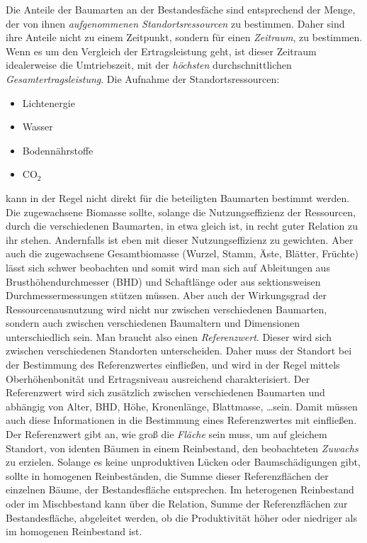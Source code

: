 \documentclass[twocolumn]{scrartcl}
\begin{document}
Die Anteile der Baumarten an der Bestandesfäche sind entsprechend der Menge, der
von ihnen \emph{aufgenommenen Standortsressourcen} zu bestimmen. Daher sind ihre
Anteile nicht zu einem Zeitpunkt, sondern für einen \emph{Zeitraum}, zu
bestimmen. Wenn es um den Vergleich der Ertragsleistung geht, ist dieser
Zeitraum idealerweise die Umtriebszeit, mit der \emph{höchsten}
durchschnittlichen \emph{Gesamtertragsleistung}. Die Aufnahme der
Standortsressourcen:
\begin{itemize}
\item Lichtenergie
\item Wasser
\item Bodennährstoffe
\item CO$_2$
\end{itemize}
kann in der Regel nicht direkt für die beteiligten Baumarten bestimmt werden.
Die zugewachsene Biomasse sollte, solange die Nutzungseffizienz der Ressourcen,
durch die verschiedenen Baumarten, in etwa gleich ist, in recht guter Relation
zu ihr stehen. Andernfalls ist eben mit dieser Nutzungseffizienz zu gewichten.
Aber auch die zugewachsene Gesamtbiomasse (Wurzel, Stamm, Äste, Blätter,
Früchte) lässt sich schwer beobachten und somit wird man sich auf Ableitungen
aus Brusthöhendurchmesser (BHD) und Schaftlänge oder aus sektionsweisen
Durchmessermessungen stützen müssen. Aber auch der Wirkungsgrad der
Ressourcenausnutzung wird nicht nur zwischen verschiedenen Baumarten, sondern
auch zwischen verschiedenen Baumaltern und Dimensionen unterschiedlich sein. Man
braucht also einen \emph{Referenzwert}. Dieser wird sich zwischen verschiedenen
Standorten unterscheiden. Daher muss der Standort bei der Bestimmung des
Referenzwertes einfließen, und wird in der Regel mittels Oberhöhenbonität und
Ertragsniveau ausreichend charakterisiert. Der Referenzwert wird sich zusätzlich
zwischen verschiedenen Baumarten und abhängig von Alter, BHD, Höhe, Kronenlänge,
Blattmasse, \dots sein. Damit müssen auch diese Informationen in die Bestimmung
eines Referenzwertes mit einfließen. Der Referenzwert gibt an, wie groß die
\emph{Fläche} sein muss, um auf gleichem Standort, von identen Bäumen in einem
Reinbestand, den beobachteten \emph{Zuwachs} zu erzielen. Solange es keine
unproduktiven Lücken oder Baumschädigungen gibt, sollte in homogenen
Reinbeständen, die Summe dieser Referenzflächen der einzelnen Bäume, der
Bestandesfläche entsprechen. Im heterogenen Reinbestand oder im Mischbestand
kann über die Relation, Summe der Referenzflächen zur Bestandesfläche,
abgeleitet werden, ob die Produktivität höher oder niedriger als im homogenen
Reinbestand ist.
\end{document}
